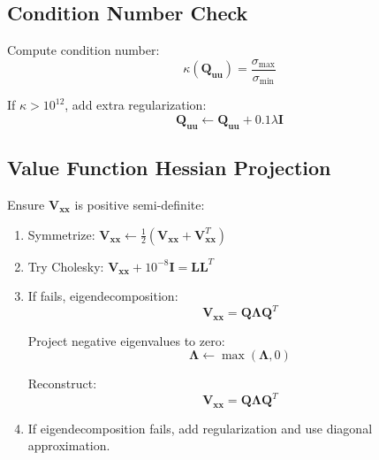 \documentclass[11pt,a4paper]{article}
\begin{document}
\subsection{Condition Number Check}

Compute condition number:
\begin{equation}
\kappa(\mathbf{Q}_{\mathbf{uu}}) = \frac{\sigma_{\max}}{\sigma_{\min}}
\end{equation}

If $\kappa > 10^{12}$, add extra regularization:
\begin{equation}
\mathbf{Q}_{\mathbf{uu}} \leftarrow \mathbf{Q}_{\mathbf{uu}} + 0.1 \lambda \mathbf{I}
\end{equation}

\subsection{Value Function Hessian Projection}

Ensure $\mathbf{V}_{\mathbf{xx}}$ is positive semi-definite:

\begin{enumerate}
    \item Symmetrize: $\mathbf{V}_{\mathbf{xx}} \leftarrow \frac{1}{2}(\mathbf{V}_{\mathbf{xx}} + \mathbf{V}_{\mathbf{xx}}^T)$
    
    \item Try Cholesky: $\mathbf{V}_{\mathbf{xx}} + 10^{-8} \mathbf{I} = \mathbf{L} \mathbf{L}^T$
    
    \item If fails, eigendecomposition:
    \begin{equation}
    \mathbf{V}_{\mathbf{xx}} = \mathbf{Q} \boldsymbol{\Lambda} \mathbf{Q}^T
    \end{equation}
    
    Project negative eigenvalues to zero:
    \begin{equation}
    \boldsymbol{\Lambda} \leftarrow \max(\boldsymbol{\Lambda}, 0)
    \end{equation}
    
    Reconstruct:
    \begin{equation}
    \mathbf{V}_{\mathbf{xx}} = \mathbf{Q} \boldsymbol{\Lambda} \mathbf{Q}^T
    \end{equation}
    
    \item If eigendecomposition fails, add regularization and use diagonal approximation.
\end{enumerate}
\end{document}
